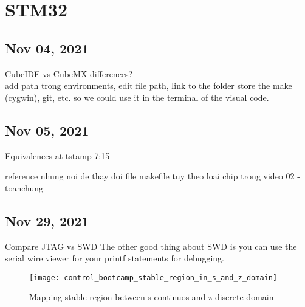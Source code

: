 \section{STM32}

\subsection{Nov 04, 2021}

CubeIDE vs CubeMX differences?
\\add path trong environments, edit file path, link to the folder store the make (cygwin), git, etc. so we could use it in the terminal of the visual code.


\subsection{Nov 05, 2021}
Equivalences at tstamp 7:15

reference nhung noi de thay doi file makefile tuy theo loai chip trong video 02 - toanchung

\subsection{Nov 29, 2021}

Compare JTAG vs SWD
The other good thing about SWD is you can use the serial wire viewer for your printf statements for debugging.
\begin{figure}[h]
  \texttt{[image: control\_bootcamp\_stable\_region\_in\_s\_and\_z\_domain]}
  \caption{Mapping stable region between s-continuos and z-discrete domain}  
\end{figure}

